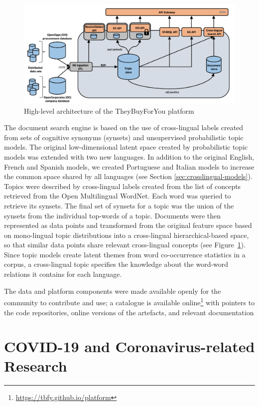 \begin{figure}[ht]
    \centering
    \includegraphics[width=0.7\linewidth]{tbfy-architecture.png}
    \caption{High-level architecture of the TheyBuyForYou platform}
    \label{fig:tbfy-architecture}
\end{figure}

The document search engine is based on the use of cross-lingual labels created from sets of cognitive synonyms (synsets) and unsupervised probabilistic topic models. The original low-dimensional latent space created by probabilistic topic models \cite{Badenes-Olmedo2019} was extended with two new languages. In addition to the original English, French and Spanish models, we created Portuguese and Italian models to increase the common space shared by all languages (see Section \ref{sec:crosslingual-models}). Topics were described by cross-lingual labels created from the list of concepts retrieved from the Open Multilingual WordNet. Each word was queried to retrieve its synsets. The final set of synsets for a topic was the union of the synsets from the individual top-words of a topic. Documents were then represented as data points and transformed from the original feature space based on mono-lingual topic distributions into a cross-lingual hierarchical-based space, so that similar data points share relevant cross-lingual concepts (see Figure~\ref{fig:tbfy-architecture}). Since topic models create latent themes from word co-occurrence statistics in a corpus, a cross-lingual topic specifies the knowledge about the word-word relations it contains for each language. 

The data and platform components were made available openly for the community to contribute and use; a catalogue is available online\footnote{\url{https://tbfy.github.io/platform}} with pointers to the code repositories, online versions of the artefacts, and relevant documentation


\section{COVID-19 and Coronavirus-related Research}
\label{sec:drugs4covid}

